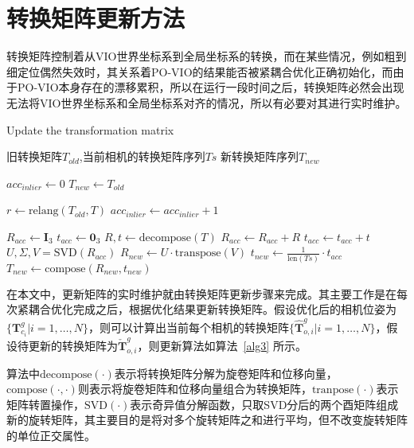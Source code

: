 \section{转换矩阵更新方法}

转换矩阵控制着从VIO世界坐标系到全局坐标系的转换，而在某些情况，例如粗到细定位偶然失效时，其关系着PO-VIO的结果能否被紧耦合优化正确初始化，而由于PO-VIO本身存在的漂移累积，所以在运行一段时间之后，转换矩阵必然会出现无法将VIO世界坐标系和全局坐标系对齐的情况，所以有必要对其进行实时维护。

\renewcommand{\algorithmicrequire}{\textbf{输入：}\unskip}
\renewcommand{\algorithmicensure}{\textbf{输出：}\unskip}
\begin{algorithm}
  \caption{Update the transformation matrix}
  \label{alg3}
  \small
  \begin{algorithmic}[1]
    \REQUIRE 旧转换矩阵$T_{old}$,当前相机的转换矩阵序列$Ts$
    \ENSURE 新转换矩阵序列$T_{new}$

    \STATE $acc_{inlier} \leftarrow 0$
    \STATE $T_{new} \leftarrow T_{old}$

      \STATE $r \leftarrow \text{relang}(T_{old}, T)$
        \STATE $acc_{inlier} \leftarrow acc_{inlier} + 1$
      \ENDIF
    \ENDFOR

      \STATE $R_{acc} \leftarrow \symbf{I}_3$
      \STATE $t_{acc} \leftarrow \symbf{0}_3$
        \STATE $R,t \leftarrow \text{decompose}(T)$
        \STATE $R_{acc} \leftarrow R_{acc} + R$
        \STATE $t_{acc} \leftarrow t_{acc} + t$
      \ENDFOR
      \STATE $U, \Sigma, V = \text{SVD}(R_{acc})$
      \STATE $R_{new} \leftarrow U\cdot \text{transpose}(V)$
      \STATE $t_{new} \leftarrow \frac{1}{\text{len}(Ts)}\cdot t_{acc}$
      \STATE $T_{new} \leftarrow \text{compose}(R_{new}, t_{new})$
    \ENDIF
  \end{algorithmic}
\end{algorithm}

在本文中，更新矩阵的实时维护就由转换矩阵更新步骤来完成。其主要工作是在每次紧耦合优化完成之后，根据优化结果更新转换矩阵。假设优化后的相机位姿为$\{ \symbf{T}_{c_i}^g | i=1,\dots, N\}$，则可以计算出当前每个相机的转换矩阵$\{ \hat{\symbf{T}}_{o,i}^g | i=1,\dots, N\}$，假设待更新的转换矩阵为$\check{\symbf{T}}_{o,i}^g$，则更新算法如算法~\ref{alg3} 所示。

算法中$\text{decompose}(\cdot)$表示将转换矩阵分解为旋卷矩阵和位移向量，$\text{compose}(\cdot, \cdot)$则表示将旋卷矩阵和位移向量组合为转换矩阵，$\text{tranpose}(\cdot)$表示矩阵转置操作，$\text{SVD}(\cdot)$表示奇异值分解函数，只取SVD分后的两个酉矩阵组成新的旋转矩阵，其主要目的是将对多个旋转矩阵之和进行平均，但不改变旋转矩阵的单位正交属性。

